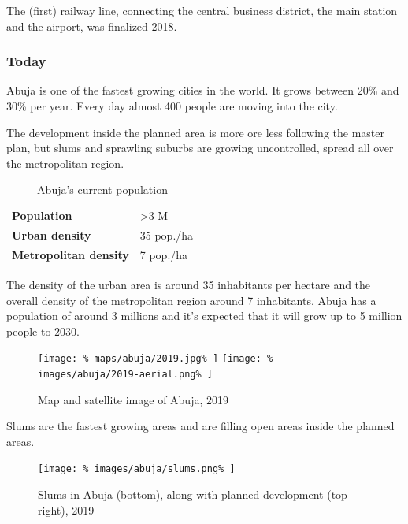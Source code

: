 \documentclass{article}
\begin{document}
\begin{multicols}{2}
			The (first) railway line, connecting the central business district, the main station and the airport, was finalized 2018.
			
			
			\subsubsection{Today}
			
			Abuja is one of the fastest growing cities in the world. It grows between 20\% and 30\% per year. Every day almost 400 people are moving into the city.
			
			The development inside the planned area is more ore less following the master plan, but slums and sprawling suburbs are growing uncontrolled, spread all over the metropolitan region.
			
			\begin{table}[H]			
				\centering
				\caption{Abuja's current population}
				\label{table:abuja-population}
				\begin{tabular}{|l|l|}
					\hline
					\textbf{Population}           & \textgreater 3 M \\
					\textbf{Urban density}        & 35 pop./ha \\
					\textbf{Metropolitan density} & 7 pop./ha \\
					\hline
				\end{tabular}
			\end{table}
			
			The density of the urban area is around 35 inhabitants per hectare and the overall density of the metropolitan region around 7 inhabitants.
			Abuja has a population of around 3 millions and it's expected that it will grow up to 5 million people to 2030.
			
			\begin{figure}[H]			
				\texttt{[image: \%
					maps/abuja/2019.jpg\%
				]}
				\texttt{[image: \%
					images/abuja/2019-aerial.png\%
				]}
				\caption{Map \cite{OpenStreetMap:Abuja} and satellite image  \cite{Satellites.pro:Abuja} of Abuja, 2019}
				\label{fig:map:abuja-map-satellite-2019}
			\end{figure}
			
			Slums are the fastest growing areas and are  filling open areas inside the planned areas.
			
			\begin{figure}[H]
				\texttt{[image: \%
					images/abuja/slums.png\%
				]}
				\caption{Slums in Abuja (bottom), along with planned development (top right), 2019 \cite{Satellites.pro:Abuja}}
				\label{fig:images:abuja-slums}
			\end{figure}
			

\end{multicols}
\end{document}
